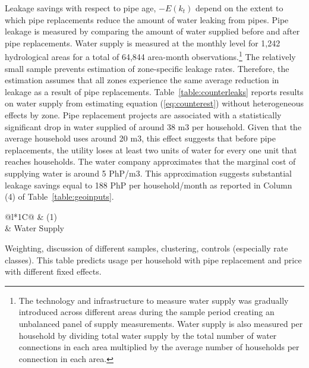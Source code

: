\documentclass[12pt,table]{article}
\begin{document}
Leakage savings with respect to pipe age, $-E(k_{t})$ depend on the extent to which pipe replacements reduce the amount of water leaking from pipes.  Pipe leakage is measured by comparing the amount of water supplied before and after pipe replacements.  Water supply is measured at the monthly level for 1,242 hydrological areas for a total of 64,844 area-month observations.\footnote{The technology and infrastructure to measure water supply was gradually introduced across different areas during the sample period creating an unbalanced panel of supply measurements.  Water supply is also measured per household by dividing total water supply by the total number of water connections in each area multiplied by the average number of households per connection in each area.}  The relatively small sample prevents estimation of zone-specific leakage rates.  Therefore, the estimation assumes that all zones experience the same average reduction in leakage as a result of pipe replacements.  Table~\ref{table:counterleaks} reports results on water supply from estimating equation (\ref{eq:counterest}) without heterogeneous effects by zone.  Pipe replacement projects are associated with a statistically significant drop in water supplied of around 38 m3 per household.  Given that the average household uses around 20 m3, this effect suggests that before pipe replacements, the utility loses at least two units of water for every one unit that reaches households.  The water company approximates that the marginal cost of supplying water is around 5 PhP/m3.  This approximation suggests substantial leakage savings equal to 188 PhP per household/month as reported in Column (4) of Table~\ref{table:geoinputs}.  


\begin{table}[h!] 
\centering
\caption{Effects of Pipe Replacements on Leakage}\label{table:counterleaks}
\vspace{-2mm} 
\begin{threeparttable} 
\begin{tabular}{@{}l*{1}{C}@{}}
\toprule
	& (1)  \\
  & Water Supply \\
\midrule

\bottomrule
\end{tabular}
\begin{tablenotes}
\footnotesize
\item Weighting, discussion of different samples, clustering, controls (especially rate classes).  This table predicts usage per household with pipe replacement and price with different fixed effects.  
\end{tablenotes}
\end{threeparttable}
\end{table}
\end{document}
